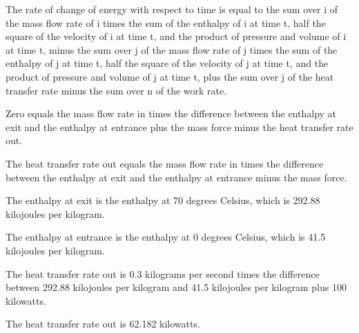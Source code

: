The rate of change of energy with respect to time is equal to the sum over i of the mass flow rate of i times the sum of the enthalpy of i at time t, half the square of the velocity of i at time t, and the product of pressure and volume of i at time t, minus the sum over j of the mass flow rate of j times the sum of the enthalpy of j at time t, half the square of the velocity of j at time t, and the product of pressure and volume of j at time t, plus the sum over j of the heat transfer rate minus the sum over n of the work rate.

Zero equals the mass flow rate in times the difference between the enthalpy at exit and the enthalpy at entrance plus the mass force minus the heat transfer rate out.

The heat transfer rate out equals the mass flow rate in times the difference between the enthalpy at exit and the enthalpy at entrance minus the mass force.

The enthalpy at exit is the enthalpy at 70 degrees Celsius, which is 292.88 kilojoules per kilogram.

The enthalpy at entrance is the enthalpy at 0 degrees Celsius, which is 41.5 kilojoules per kilogram.

The heat transfer rate out is 0.3 kilograms per second times the difference between 292.88 kilojoules per kilogram and 41.5 kilojoules per kilogram plus 100 kilowatts.

The heat transfer rate out is 62.182 kilowatts.